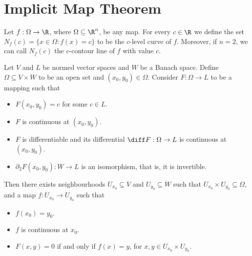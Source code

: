 \section{Implicit Map Theorem}

\begin{definition}
\label{def:level-curve}
Let \(f: \Omega \to \R\), where \(\Omega \subseteq \R^n\), be any map. For every \(c \in \R\) we
define the set \(N_f(c) = \{x \in \Omega \colon f(x) = c\}\) to be the \(c\)-level
curve of \(f\). Moreover, if \(n = 2\), we can call \(N_f(c)\) the \(c\)-contour
line of \(f\) with value \(c\).
\end{definition}

\begin{theorem}
\label{thm:implicit-map}
Let \(V\) and \(L\) be normed vector spaces and \(W\) be a Banach
space. Define \(\Omega \subseteq V \times W\) to be an open set and \((x_0, y_0) \in \Omega\). Consider
\(F: \Omega \to L\) to be a mapping such that
\begin{itemize}\setlength\itemsep{0em}
  \item \(F(x_0, y_0) = c\) for some \(c \in L\).
  \item \(F\) is continuous at \((x_0, y_0)\).
  \item \(F\) is differentiable and its differential \(\diff F: \Omega \to L\)
    is continuous at \((x_0, y_0)\).
  \item \(\partial_2F(x_0, y_0): W \to L\) is an isomorphism, that is, it is invertible.
\end{itemize}
Then there exists neighbourhoods \(U_{x_0} \subseteq V\) and \(U_{y_0} \subseteq W\) such that
\(U_{x_0} \times U_{y_0} \subseteq \Omega\), and a map \(f: U_{x_0} \to U_{y_0}\) such that
\begin{itemize}\setlength\itemsep{0em}
  \item \(f(x_0) = y_0\).
  \item \(f\) is continuous at \(x_0\).
  \item \(F(x, y) = 0\) if and only if \(f(x) = y\), for \(x, y \in U_{x_0} \times
  U_{y_0}\).
\end{itemize}
\end{theorem}

